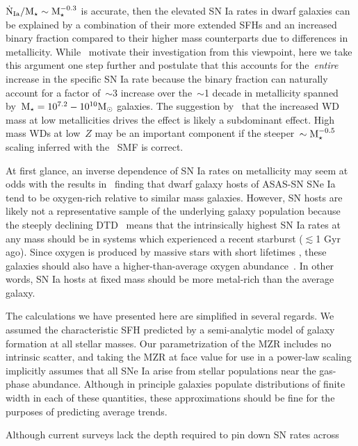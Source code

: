 \documentclass[ms.tex]{subfiles}
\begin{document}
$\dot{\text{N}}_\text{Ia} / \text{M}_\star \sim \text{M}_\star^{-0.3}$ is accurate, then the
elevated SN Ia rates in dwarf galaxies can be explained by a combination of
their more extended SFHs and an increased binary fraction compared to their
higher mass counterparts due to differences in metallicity.
While~\citet{Gandhi2022} motivate their investigation from this viewpoint, here
we take this argument one step further and postulate that this accounts for
the~\textit{entire} increase in the specific SN Ia rate because the binary
fraction can naturally account for a factor of~$\sim$3 increase over
the~$\sim$1 decade in metallicity spanned by~$\text{M}_\star = 10^{7.2} - 10^{10}
\text{M}_\odot$ galaxies.
The suggestion by~\citet{Kistler2013} that the increased WD mass at low
metallicities drives the effect is likely a subdominant effect.
High mass WDs at low~$Z$ may be an important component if the
steeper~$\sim \text{M}_\star^{-0.5}$ scaling inferred with the~\citet{Bell2003} SMF is
correct.
\par
At first glance, an inverse dependence of SN Ia rates on metallicity may seem
at odds with the results in~\citet{Holoien2022} finding that dwarf galaxy
hosts of ASAS-SN SNe Ia tend to be oxygen-rich relative to similar mass
galaxies.
However, SN hosts are likely not a representative sample of the underlying
galaxy population because the steeply declining DTD~\citep[e.g.,][]{Maoz2012a}
means that the intrinsically highest SN Ia rates at any mass should be in
systems which experienced a recent starburst ($\lesssim$1 Gyr ago).
Since oxygen is produced by massive stars with short lifetimes
\citep*[e.g.,][]{Hurley2000, Johnson2019}, these galaxies should also have a
higher-than-average oxygen abundance~\citep[see, e.g.,][]{Johnson2020}.
In other words, SN Ia hosts at fixed mass should be more metal-rich than the
average galaxy.
\par
The calculations we have presented here are simplified in several regards.
We assumed the characteristic SFH predicted by a semi-analytic model of
galaxy formation at all stellar masses.
Our parametrization of the MZR includes no intrinsic scatter, and taking the
\citet{Zahid2014} MZR at face value for use in a power-law scaling implicitly
assumes that all SNe Ia arise from stellar populations near the gas-phase
abundance.
Although in principle galaxies populate distributions of finite width in each
of these quantities, these approximations should be fine for the purposes of
predicting average trends.
\par
Although current surveys lack the depth required to pin down SN rates across
\end{document}
